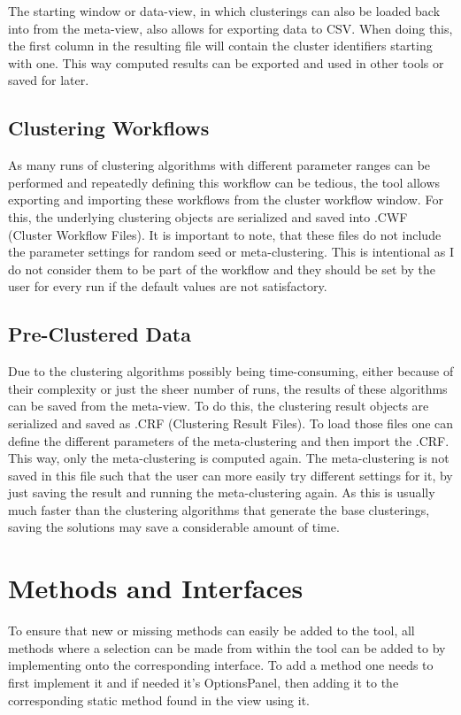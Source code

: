 \documentclass[
	a4paper,
	english,
	twoside,
	openright,               
	11pt                            
	]{report}
\begin{document}
The starting window or data-view, in which clusterings can also be loaded back into from the meta-view, also allows for exporting data to CSV. When doing this, the first column in the resulting file will contain the cluster identifiers starting with one. This way computed results can be exported and used in other tools or saved for later.

\subsection{Clustering Workflows}
As many runs of clustering algorithms with different parameter ranges can be performed and repeatedly defining this workflow can be tedious, the tool allows exporting and importing these workflows from the cluster workflow window. For this, the underlying clustering objects are serialized and saved into .CWF (Cluster Workflow Files). It is important to note, that these files do not include the parameter settings for random seed or meta-clustering. This is intentional as I do not consider them to be part of the workflow and they should be set by the user for every run if the default values are not satisfactory.

\subsection{Pre-Clustered Data}
Due to the clustering algorithms possibly being time-consuming, either because of their complexity or just the sheer number of runs, the results of these algorithms can be saved from the meta-view. To do this, the clustering result objects are serialized and saved as .CRF (Clustering Result Files). To load those files one can define the different parameters of the meta-clustering and then import the .CRF. This way, only the meta-clustering is computed again. The meta-clustering is not saved in this file such that the user can more easily try different settings for it, by just saving the result and running the meta-clustering again. As this is usually much faster than the clustering algorithms that generate the base clusterings, saving the solutions may save a considerable amount of time.

\section{Methods and Interfaces}
To ensure that new or missing methods can easily be added to the tool, all methods where a selection can be made from within the tool can be added to by implementing onto the corresponding interface. To add a method one needs to first implement it and if needed it's OptionsPanel, then adding it to the corresponding static method found in the view using it.
\end{document}
